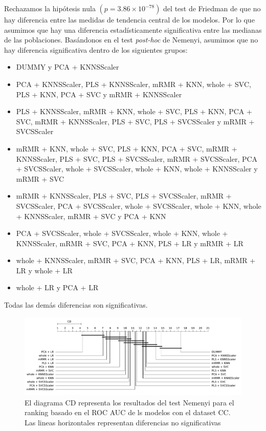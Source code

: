 \documentclass[a4paper,oneside,11pt,leqno]{article}
\begin{document}
	Rechazamos la hipótesis nula $(p=3.86\times 10^{-78})$ del test de Friedman de que no hay diferencia entre las medidas de tendencia central de los modelos. Por lo que asumimos que hay una diferencia estadísticamente significativa entre las medianas de las poblaciones.
	\clearpage
	Basándonos en el test \textit{post-hoc} de Nemenyi, asumimos que no hay diferencia significativa dentro de los siguientes grupos:

	\begin{itemize}
		\item DUMMY y PCA + KNNSScaler

		\item PCA + KNNSScaler, PLS + KNNSScaler, mRMR + KNN, whole + SVC, PLS + KNN, PCA + SVC y mRMR + KNNSScaler

		\item PLS + KNNSScaler, mRMR + KNN, whole + SVC, PLS + KNN, PCA + SVC, mRMR + KNNSScaler, PLS + SVC, PLS + SVCSScaler y mRMR + SVCSScaler

		\item mRMR + KNN, whole + SVC, PLS + KNN, PCA + SVC, mRMR + KNNSScaler, PLS + SVC, PLS + SVCSScaler, mRMR + SVCSScaler, PCA + SVCSScaler, whole + SVCSScaler, whole + KNN, whole + KNNSScaler y mRMR + SVC

		\item  mRMR + KNNSScaler, PLS + SVC, PLS + SVCSScaler, mRMR + SVCSScaler, PCA + SVCSScaler, whole + SVCSScaler, whole + KNN, whole + KNNSScaler, mRMR + SVC y PCA + KNN

		\item  PCA + SVCSScaler, whole + SVCSScaler, whole + KNN, whole + KNNSScaler, mRMR + SVC, PCA + KNN, PLS + LR y mRMR + LR

		\item  whole + KNNSScaler, mRMR + SVC, PCA + KNN, PLS + LR, mRMR + LR y whole + LR

		\item whole + LR y PCA + LR
	\end{itemize}

	Todas las demás diferencias son significativas.

	\begin{figure}[h]
		\includegraphics[width=\linewidth]{stat_results_cc.pdf}
		\caption{El diagrama CD representa los resultados del test Nemenyi para el ranking basado en el ROC AUC de ls modelos con el dataset CC. Las lineas horizontales representan diferencias no significativas}
		\label{fig:stats_fig_cc}
	\end{figure}
\end{document}
